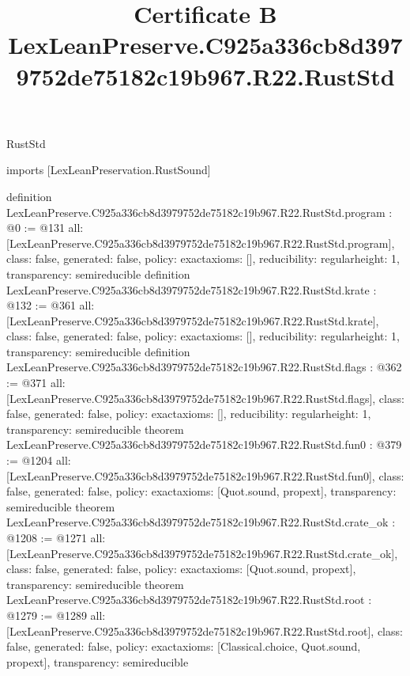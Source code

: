 \begin{lexlean}{RustStd}
\title{Certificate B LexLeanPreserve.C925a336cb8d3979752de75182c19b967.R22.RustStd}
\begin{coremodule}
imports [LexLeanPreservation.RustSound]

definition LexLeanPreserve.C925a336cb8d3979752de75182c19b967.R22.RustStd.program : @0 := @131 {
  all: [LexLeanPreserve.C925a336cb8d3979752de75182c19b967.R22.RustStd.program],
  class: false,
  generated: false,
  policy: exact{axioms: []},
  reducibility: regular{height: 1},
  transparency: semireducible
}
definition LexLeanPreserve.C925a336cb8d3979752de75182c19b967.R22.RustStd.krate : @132 := @361 {
  all: [LexLeanPreserve.C925a336cb8d3979752de75182c19b967.R22.RustStd.krate],
  class: false,
  generated: false,
  policy: exact{axioms: []},
  reducibility: regular{height: 1},
  transparency: semireducible
}
definition LexLeanPreserve.C925a336cb8d3979752de75182c19b967.R22.RustStd.flags : @362 := @371 {
  all: [LexLeanPreserve.C925a336cb8d3979752de75182c19b967.R22.RustStd.flags],
  class: false,
  generated: false,
  policy: exact{axioms: []},
  reducibility: regular{height: 1},
  transparency: semireducible
}
theorem LexLeanPreserve.C925a336cb8d3979752de75182c19b967.R22.RustStd.fun0 : @379 := @1204 {
  all: [LexLeanPreserve.C925a336cb8d3979752de75182c19b967.R22.RustStd.fun0],
  class: false,
  generated: false,
  policy: exact{axioms: [Quot.sound, propext]},
  transparency: semireducible
}
theorem LexLeanPreserve.C925a336cb8d3979752de75182c19b967.R22.RustStd.crate_ok : @1208 := @1271 {
  all: [LexLeanPreserve.C925a336cb8d3979752de75182c19b967.R22.RustStd.crate_ok],
  class: false,
  generated: false,
  policy: exact{axioms: [Quot.sound, propext]},
  transparency: semireducible
}
theorem LexLeanPreserve.C925a336cb8d3979752de75182c19b967.R22.RustStd.root : @1279 := @1289 {
  all: [LexLeanPreserve.C925a336cb8d3979752de75182c19b967.R22.RustStd.root],
  class: false,
  generated: false,
  policy: exact{axioms: [Classical.choice, Quot.sound, propext]},
  transparency: semireducible
}


\end{coremodule}
\end{lexlean}
